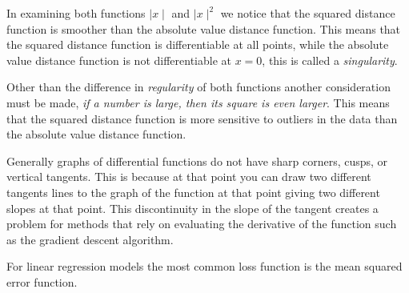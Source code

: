 \documentclass[12pt letter]{report}
\begin{document}
In examining both functions $ \mid x \mid $ and $ \mid x  \mid ^2$ we notice that the squared distance function is
smoother than the absolute value distance function. This means that the squared distance function is differentiable at
all points, while the absolute value distance function is not differentiable at $x=0$, this is called a
\textit{singularity}.

Other than the difference in \textit{regularity} of both functions another consideration must be made, \textit{if a
  number is large, then its square is even larger}. This means that the squared distance function is more sensitive to
outliers in the data than the absolute value distance function.


Generally graphs of differential functions do not have sharp corners, cusps, or vertical tangents. This is because at
that point you can draw two different tangents lines to the graph of the function at that point giving two different
slopes at that point. This discontinuity in the slope of the tangent creates a problem for methods that rely on
evaluating the derivative of the function such as the gradient descent algorithm.

For linear regression models the most common loss function is the mean squared error function.

\end{document}
